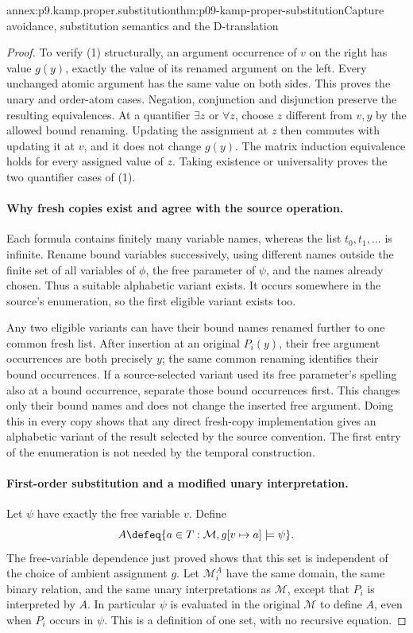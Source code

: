 \begin{annexitem}{annex:p9.kamp.proper.substitution}{thm:p09-kamp-proper-substitution}{Capture avoidance, substitution semantics and the D-translation}
\begin{proof}
To verify (1) structurally, an argument occurrence of \(v\) on the
right has value \(g(y)\), exactly the value of its renamed argument on
the left. Every unchanged atomic argument has the same value on both
sides. This proves the unary and order-atom cases. Negation, conjunction
and disjunction preserve the resulting equivalences. At a quantifier
\(\exists z\) or \(\forall z\), choose \(z\) different from
\(v,y\) by the allowed bound renaming. Updating the assignment at
\(z\) then commutes with updating it at \(v\), and it does not
change \(g(y)\). The matrix induction equivalence holds for every
assigned value of \(z\). Taking existence or universality proves the
two quantifier cases of (1).

\paragraph{Why fresh copies exist and agree with the source operation.}
Each formula contains finitely many variable names, whereas the list
\(t_0,t_1,\ldots\) is infinite. Rename bound variables successively,
using different names outside the finite set of all variables of
\(\phi\), the free parameter of \(\psi\), and the names already
chosen. Thus a suitable alphabetic variant exists. It occurs somewhere
in the source's enumeration, so the first eligible variant exists too.

Any two eligible variants can have their bound names renamed further to
one common fresh list. After insertion at an original \(P_i(y)\),
their free argument occurrences are both precisely \(y\); the same
common renaming identifies their bound occurrences. If a source-selected
variant used its free parameter's spelling also at a bound occurrence,
separate those bound occurrences first. This changes only their bound
names and does not change the inserted free argument. Doing this in every
copy shows that any direct fresh-copy implementation gives an alphabetic
variant of the result selected by the source convention. The first entry
of the enumeration is not needed by the temporal construction.

\paragraph{First-order substitution and a modified unary interpretation.}
Let \(\psi\) have exactly the free variable \(v\). Define
\[
 A\defeq\{a\in T:\mathcal M,g[v\mapsto a]\models\psi\}.
\]
The free-variable dependence just proved shows that this set is independent
of the choice of ambient assignment \(g\). Let \(\mathcal M_i^A\)
have the same domain, the same binary relation, and the same unary
interpretations as \(\mathcal M\), except that \(P_i\) is interpreted
by \(A\). In particular \(\psi\) is evaluated in the original
\(\mathcal M\) to define \(A\), even when \(P_i\) occurs in
\(\psi\). This is a definition of one set, with no recursive equation.


\end{proof}
\end{annexitem}
